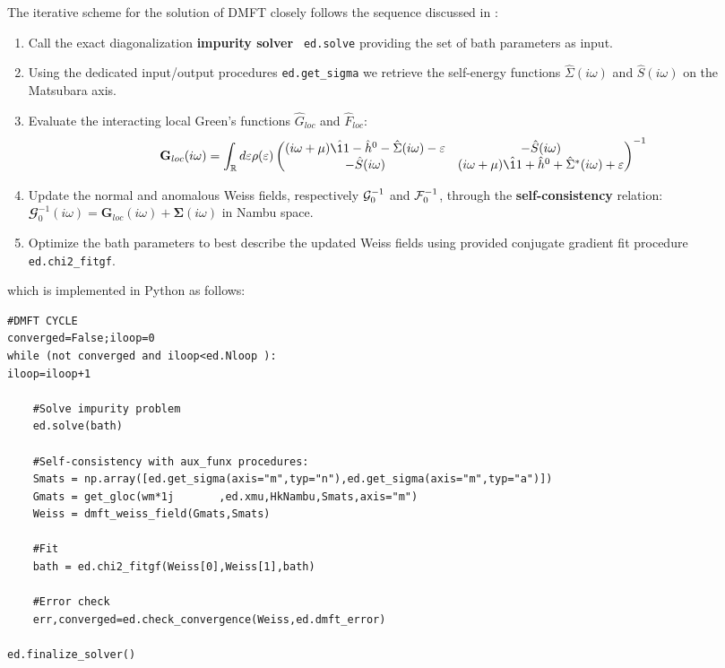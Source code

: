 \documentclass[edipack2.tex]{subfiles}
\begin{document}
The iterative scheme for the solution of DMFT closely follows the
sequence discussed in :   
\begin{enumerate}
\item Call the exact diagonalization {\bf impurity solver} {\tt
    ed.solve} providing the set of bath parameters as input. 
\item Using the dedicated
  input/output procedures {\tt ed.get\_sigma} we retrieve the self-energy functions  
  $\hat{\Sigma}(i\omega)$ and $\hat{S}(i\omega)$ on the 
  Matsubara axis.
\item
  Evaluate the interacting local Green's functions $\hat{G}_{loc}$ and
  $\hat{F}_{loc}$:
  \begin{equation}
  {\mathbf G}_{loc}(i\omega) =
  \int_\RRR d\e \rho(\e)
  \begin{pmatrix}
    (i\omega +\mu)\hat{\11} - \hat{h}^0 - \hat{\Sigma}(i\omega) -\e & -\hat{S}(i\omega) \\
    -\hat{S}(i\omega) & (i\omega +\mu)\hat{\11} + \hat{h}^0 +
    \hat{\Sigma}^*(i\omega) +\e\\
  \end{pmatrix}^{-1}
\end{equation}
\item Update the normal and anomalous Weiss fields, respectively 
  ${\cal G}_0^{-1}$ and ${\cal F}_0^{-1}$, through the {\bf self-con\-sis\-ten\-cy}
    relation: $\mathbfcal{G}^{-1}_0(i\omega) = {\mathbf G}_{loc}(i\omega) +
    {\mathbf \Sigma}(i\omega)$ in Nambu space. 
  \item Optimize the bath parameters  to best describe the  updated
    Weiss fields using \NAME provided conjugate gradient  fit
    procedure {\tt ed.chi2\_fitgf}.
\end{enumerate}
which is implemented in Python as follows:
\begin{lstlisting}[style=mypython,numbers=none,basicstyle={\scriptsize\ttfamily}]
#DMFT CYCLE
converged=False;iloop=0
while (not converged and iloop<ed.Nloop ):
iloop=iloop+1

    #Solve impurity problem
    ed.solve(bath)
    
    #Self-consistency with aux_funx procedures:
    Smats = np.array([ed.get_sigma(axis="m",typ="n"),ed.get_sigma(axis="m",typ="a")])    
    Gmats = get_gloc(wm*1j       ,ed.xmu,HkNambu,Smats,axis="m") 
    Weiss = dmft_weiss_field(Gmats,Smats)                  
          
    #Fit
    bath = ed.chi2_fitgf(Weiss[0],Weiss[1],bath)

    #Error check
    err,converged=ed.check_convergence(Weiss,ed.dmft_error)

ed.finalize_solver()
\end{lstlisting}
\end{document}
